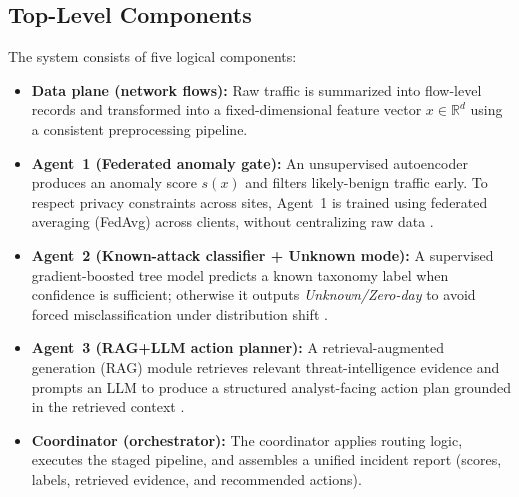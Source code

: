 \documentclass[conference]{IEEEtran}
\begin{document}
\subsection{Top-Level Components}
The system consists of five logical components:
\begin{itemize}
  \item \textbf{Data plane (network flows):} Raw traffic is summarized into flow-level records and transformed into a fixed-dimensional feature vector $x\in\mathbb{R}^d$ using a consistent preprocessing pipeline.
  \item \textbf{Agent~1 (Federated anomaly gate):} An unsupervised autoencoder produces an anomaly score $s(x)$ and filters likely-benign traffic early. To respect privacy constraints across sites, Agent~1 is trained using federated averaging (FedAvg) across clients, without centralizing raw data \cite{mcmahan2017fedavg,kairouz2021flsurvey}.
  \item \textbf{Agent~2 (Known-attack classifier + Unknown mode):} A supervised gradient-boosted tree model predicts a known taxonomy label when confidence is sufficient; otherwise it outputs \emph{Unknown/Zero-day} to avoid forced misclassification under distribution shift \cite{Chen2016XGBoost,Scheirer2013OpenSet,Bendale2016OpenMax}.
  \item \textbf{Agent~3 (RAG+LLM action planner):} A retrieval-augmented generation (RAG) module retrieves relevant threat-intelligence evidence and prompts an LLM to produce a structured analyst-facing action plan grounded in the retrieved context \cite{Lewis2020RAG,nist80061,MITREATTACK,MITRECVE,NISTNVD}.
  \item \textbf{Coordinator (orchestrator):} The coordinator applies routing logic, executes the staged pipeline, and assembles a unified incident report (scores, labels, retrieved evidence, and recommended actions).
\end{itemize}
\end{document}

